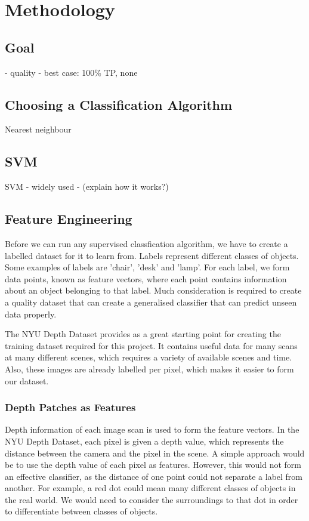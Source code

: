 \documentclass[dissertation.tex]{subfiles}
\begin{document}
\chapter{Methodology}
\label{chap:methodology}

\section{Goal}
- quality - best case: 100\% TP, none

\section{Choosing a Classification Algorithm}
Nearest neighbour

\section{SVM}
SVM
- widely used
- (explain how it works?)

\section{Feature Engineering}
Before we can run any supervised classfication algorithm, we have to create a labelled dataset for it to learn from. Labels represent different classes of objects. Some examples of labels are 'chair', 'desk' and 'lamp'. For each label, we form data points, known as feature vectors, where each point contains information about an object belonging to that label. Much consideration is required to create a quality dataset that can create a generalised classifier that can predict unseen data properly.

The NYU Depth Dataset provides as a great starting point for creating the training dataset required for this project. It contains useful data for many scans at many different scenes, which requires a variety of available scenes and time. Also, these images are already labelled per pixel, which makes it easier to form our dataset. 

\subsection{Depth Patches as Features}
Depth information of each image scan is used to form the feature vectors. In the NYU Depth Dataset, each pixel is given a depth value, which represents the distance between the camera and the pixel in the scene. A simple approach would be to use the depth value of each pixel as features. However, this would not form an effective classifier, as the distance of one point could not separate a label from another. For example, a red dot could mean many different classes of objects in the real world. We would need to consider the surroundings to that dot in order to differentiate between classes of objects.
\end{document}
